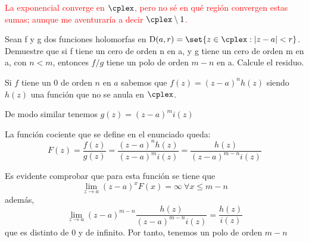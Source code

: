 \textcolor{red}{La exponencial converge en $\cplex$, pero no sé en qué región convergen estas sumas; aunque me aventuraría a decir $\cplex \setminus 1$.}

\begin{problem}[3]
Sean f y g dos funciones holomorfas en ${\mbox D(a, r) = \set{z \in \cplex : |z - a| < r}}$. Demuestre que si f tiene un cero de orden n en a, y g tiene un cero de orden m en a, con $n < m$, entonces $f / g$ tiene un polo de orden $m - n$ en a. Calcule el residuo.
\solution


Si $f$ tiene un 0 de orden $n$ en $a$ sabemos que $f(z)=(z-a)^nh(z)$ siendo $h(z)$ una función que no se anula en $\cplex$.

De modo similar tenemos $g(z)=(z-a)^mi(z)$

La función cociente que se define en el enunciado queda:
\[F(z)=\frac{f(z)}{g(z)}=\frac{(z-a)^nh(z)}{(z-a)^mi(z)} =\frac{h(z)}{(z-a)^{m-n}i(z)}\]

Es evidente comprobar que para esta función se tiene que
\[\lim_{z \to a } (z-a)^xF(x)=\infty \ \forall x \leq {m-n}\]
además,
\[\lim_{z \to a } (z-a)^{m-n}\frac{h(z)}{(z-a)^{m-n}i(z)} = \frac{h(z)}{i(z)}\]
que es distinto de 0 y de infinito. Por tanto, tenemos un polo de orden $m-n$
\end{problem}

